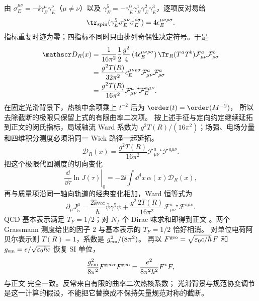 \begin{derivation}[轴向变换中的费米子测度与反常]
由 $\sigma_E^{\mu\nu}=-\ii\gamma_E^\mu\gamma_E^\nu$（$\mu\ne\nu$）以及
$\gamma_E^5=-\gamma_E^0\gamma_E^1\gamma_E^2\gamma_E^3$，逐项反对易给
\begin{equation*}
\tr_{\rm spin}(\gamma_E^5\sigma_E^{\mu\nu}\sigma_E^{\rho\sigma})
=4\epsilon_E^{\mu\nu\rho\sigma}.
\end{equation*}
指标重复时迹为零；四指标不同时只由排列奇偶性决定符号。于是
\begin{align*}
\mathscr D_R(x)
&=\frac1{16\pi^2}\frac12\frac{g^2}{4}
\left(4\epsilon_E^{\mu\nu\rho\sigma}\right)
\Tr_R(T^aT^b)\mathcal F_{\mu\nu}^a\mathcal F_{\rho\sigma}^b\\
&=\frac{g^2T(R)}{32\pi^2}
\epsilon_E^{\mu\nu\rho\sigma}\mathcal F_{\mu\nu}^a\mathcal F_{\rho\sigma}^a\\
&=\frac{g^2T(R)}{16\pi^2}
\mathcal F_{\mu\nu}^a{}^\star\!\mathcal F_E^{a\mu\nu}.
\end{align*}
在固定光滑背景下，热核中余项乘上 $t^{-2}$ 后为 $\order(t)=\order(M^{-2})$，
所以去除截断的极限只保留上式的有限曲率二次项。
按上述手征与定向约定继续延拓到正文的闵氏指标，局域轴流 Ward 系数为
$g^2T(R)/(16\pi^2)$；场强、电场分量和四维积分测度必须沿同一 Wick 路径一起延拓。
\begin{equation*}
\mathscr D_R(x)
=\frac{g^2T(R)}{16\pi^2}
\mathcal F_{\mu\nu}^a{}^\star\!\mathcal F^{a\mu\nu}.
\end{equation*}
把这个极限代回测度的切向变化
\begin{equation*}
 \left.\frac{\dd}{\dd\tau}\ln J(\tau)\right|_{0}
 =-2\ii\int\dd^4x\,\alpha(x)\mathscr D_R(x),
\end{equation*}
再与质量项沿同一轴向轨道的经典变化相加，Ward 恒等式为
\begin{equation*}
 \partial_\mu J_5^\mu
 =\frac{2\ii mc}{\hbar}\bar\psi\gamma^5\psi
 +\frac{g^2\,2T(R)}{16\pi^2}
 \mathcal F_{\mu\nu}^a{}^\star\!\mathcal F^{a\mu\nu}.
\end{equation*}
QCD 基本表示满足 $T_F=1/2$；对 $N_f$ 个 Dirac 味求和即得到正文
。两个 Grassmann 测度给出的因子 $2$
与基本表示的 $T_F=1/2$ 恰好相消。
对单位电荷阿贝尔表示则 $T(R)=1$，系数是 $g_{\rm em}^2/(8\pi^2)$。
再以 $F^{\rm geo}=\sqrt{\varepsilon_0c/\hbar}\,F$ 和
$g_{\rm em}=e/\sqrt{\varepsilon_0\hbar c}$ 恢复 SI 单位，
\begin{equation*}
\frac{g_{\rm em}^2}{8\pi^2}F^{\rm geo}{}^\star F^{\rm geo}
=\frac{e^2}{8\pi^2\hbar^2}F{}^\star F,
\end{equation*}
与正文 完全一致。反常来自有限的曲率二次热核系数；
光滑背景与规范协变调节是这一计算的假设，不能把它替换成不保持矢量规范对称的截断。
\end{derivation}

